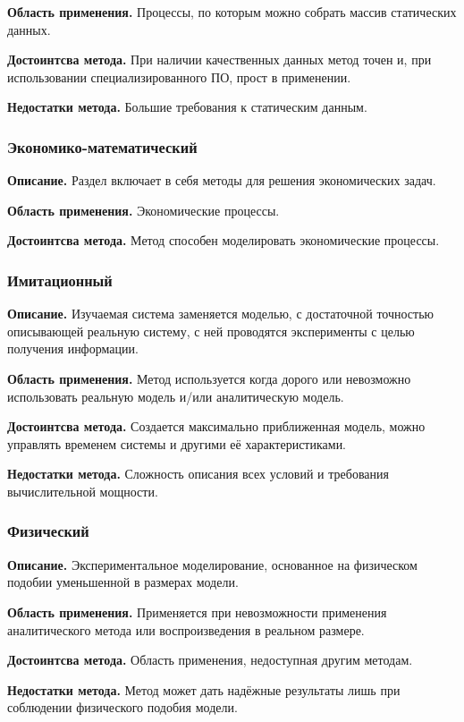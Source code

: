 \textbf{Область применения.} Процессы, по которым можно собрать массив статических данных.

\textbf{Достоинтсва метода.} При наличии качественных данных метод точен и, при использовании специализированного ПО, прост в применении.

\textbf{Недостатки метода.} Большие требования к статическим данным.
\subsubsection*{Экономико-математический}
\textbf{Описание.} Раздел включает в себя методы для решения экономических задач.

\textbf{Область применения.} Экономические процессы.

\textbf{Достоинтсва метода.} Метод способен моделировать экономические процессы.

\subsubsection*{Имитационный}
\textbf{Описание.} Изучаемая система заменяется моделью, с достаточной точностью описывающей реальную систему, с ней проводятся эксперименты с целью получения информации.

\textbf{Область применения.} Метод используется когда дорого или невозможно использовать реальную модель и/или аналитическую модель.

\textbf{Достоинтсва метода.} Создается максимально приближенная модель, можно управлять временем системы и другими её характеристиками.

\textbf{Недостатки метода.} Сложность описания всех условий и требования вычислительной мощности.

\subsubsection*{Физический}
\textbf{Описание.} Экспериментальное моделирование, основанное на физическом подобии уменьшенной в размерах модели.

\textbf{Область применения.} Применяется при невозможности применения аналитического метода или воспроизведения в реальном размере.

\textbf{Достоинтсва метода.} Область применения, недоступная другим методам.

\textbf{Недостатки метода.} Метод может дать надёжные результаты лишь при соблюдении физического подобия модели.

